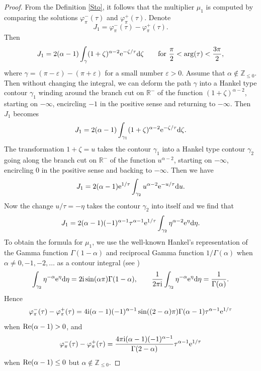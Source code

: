 \documentclass[10pt,a4paper]{amsart}
\numberwithin{equation}{section}
\begin{document}
 \begin{proof}
 From the Definition \ref{Sto}, it follows that the multiplier $\mu_1$ is computed by comparing the solutions
 $\varphi^{-}_{\pi}(\tau)$ and $\varphi^{+}_{\pi}(\tau)$. Denote
 \[
 J_1= \varphi^{-}_{\pi}(\tau) - \varphi^{+}_{\pi}(\tau) .
 \]
 Then
 \[
 J_1=
 2 (\alpha-1) \int_\gamma (1+\zeta)^{\alpha-2} {\rm e}^{-\zeta/\tau} {\rm d} \zeta\qquad {\rm for}\
 \frac{\pi}{2} < \arg (\tau) < \frac{3 \pi}{2} ,
 \]
 where $\gamma=(\pi-\varepsilon) - (\pi+\varepsilon)$ for a small number $\varepsilon > 0$. Assume that $\alpha\notin\mathbb{Z}_{\leq 0}$. Then
 without changing the integral, we can deform the path $\gamma$ into a Hankel type contour $\gamma_1$ winding around
 the branch cut on $\mathbb{R}^{-}$ of the function $(1+\zeta)^{\alpha-2}$, starting on $-\infty$, encircling $-1$ in the positive sense and returning to $-\infty$.
 Then $J_1$ becomes
 \[
 J_1=
 2 (\alpha-1) \int_{\gamma_1}
 (1+\zeta)^{\alpha-2} {\rm e}^{-\zeta/\tau} {\rm d} \zeta .
 \]
 The transformation $1+\zeta=u$ takes the contour $\gamma_1$ into a Hankel type contour $\gamma_2$ going along the branch cut
 on $\mathbb{R}^{-}$ of the function $u^{\alpha-2}$,
 starting on $-\infty$, encircling $0$ in the positive sense and backing to $-\infty$. Then we have
 \[
 J_1=
 2 (\alpha-1) {\rm e}^{1/\tau}\int_{\gamma_2}
 u^{\alpha-2} {\rm e}^{-u/\tau} {\rm d} u .
 \]
 Now the change $u/\tau=-\eta$ takes the contour $\gamma_2$ into itself and we find that
 \[
 J_1=
 2 (\alpha-1) (-1)^{\alpha-1} \tau^{\alpha-1} {\rm e}^{1/\tau}\int_{\gamma_2}
 \eta^{\alpha-2} {\rm e}^{\eta} {\rm d} \eta .
 \]
 To obtain the formula for $\mu_1$, we use the well-known Hankel's representation of the Gamma function $\Gamma(1-\alpha)$
 and reciprocal Gamma function $1/\Gamma(\alpha)$ when $\alpha\neq 0, -1, -2, \dots$
 as a contour integral (see \cite[1.6\,(1) and 1.6\,(2)]{BE})
 \begin{equation*}
 \int_{\gamma_2} \eta^{-\alpha} {\rm e}^{\eta} {\rm d} \eta=2 {\rm i} \sin (\alpha \pi) \Gamma(1-\alpha),\qquad
 \frac{1}{2 \pi {\rm i}} \int_{\gamma_2} \eta^{-\alpha} {\rm e}^{\eta} {\rm d} \eta=\frac{1}{\Gamma(\alpha)} .%
 \end{equation*}
 Hence
 \[
 \varphi^{-}_{\pi}(\tau) - \varphi^{+}_{\pi}(\tau)=
 4 {\rm i} (\alpha-1) (-1)^{\alpha-1} \sin((2-\alpha) \pi) \Gamma(\alpha-1)\tau^{\alpha-1} {\rm e}^{1/\tau}
 \]
 when ${\rm Re} (\alpha-1) > 0$, and
 \[
 \varphi^{-}_{\pi}(\tau) - \varphi^{+}_{\pi}(\tau)=
 \frac{4 \pi {\rm i} (\alpha-1) (-1)^{\alpha-1}}{\Gamma(2-\alpha)} \tau^{\alpha-1} {\rm e}^{1/\tau}
 \]
 when ${\rm Re} (\alpha-1) \leq 0$ but $\alpha\notin\mathbb{Z}_{\leq 0}$.


\end{proof}
\end{document}
